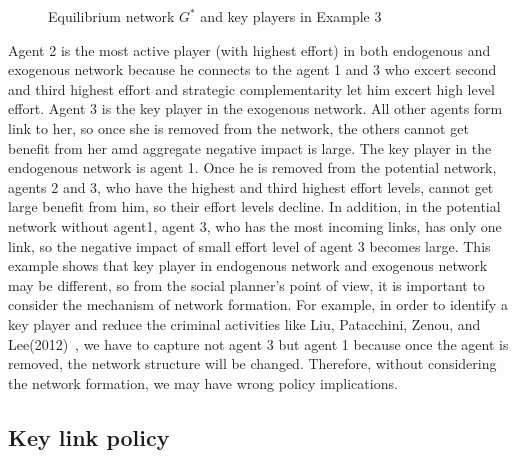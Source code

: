 \documentclass[12pt]{article}
\theoremstyle{definition}
\begin{document}
\begin{figure}[h]
\caption{Equilibrium network $G^{*}$ and key players in Example 3} \label{fig:ex3}
\end{figure}

Agent 2 is the most active player (with highest effort) in both endogenous and exogenous network because he connects to the agent 1 and 3 who excert second and third highest effort and strategic complementarity let him excert high level effort.
Agent 3 is the key player in the exogenous network.
All other agents form link to her, so once she is removed from the network, the others cannot get benefit from her amd aggregate negative impact is large.
The key player in the endogenous network is agent 1.
Once he is removed from the potential network, agents 2 and 3, who have the highest and third highest effort levels, cannot get large benefit from him, so their effort levels decline.
In addition, in the potential network without agent1, agent 3, who has the most incoming links, has only one link, so the negative impact of small effort level of agent 3 becomes large.
This example shows that key player in endogenous network and exogenous network may be different, so from the social planner's point of view, it is important to consider the mechanism of network formation.
For example, in order to identify a key player and reduce the criminal activities like Liu, Patacchini, Zenou, and Lee(2012)~\cite{criminal}, we have to capture not agent 3 but agent 1 because once the agent is removed, the network structure will be changed.
Therefore, without considering the network formation, we may have wrong policy implications.

\subsection{Key link policy}
\end{document}
